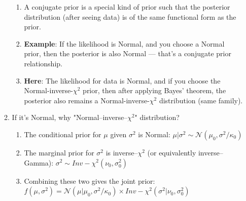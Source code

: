\begin{enumerate}
\begin{enumerate}
\begin{enumerate}
            \item A conjugate prior is a special kind of prior such that the posterior distribution (after seeing data) is of the same functional form as the prior.
            \hfill \cite{common/online/chatgpt}

            \item \textbf{Example}: If the likelihood is Normal, and you choose a Normal prior, then the posterior is also Normal — that’s a conjugate prior relationship.
            \hfill \cite{common/online/chatgpt}

            \item \textbf{Here}: The likelihood for data is Normal, and if you choose the Normal-inverse-$\chi^2$ prior, then after applying Bayes’ theorem, the posterior also remains a Normal-inverse-$\chi^2$ distribution (same family).
            \hfill \cite{common/online/chatgpt}
        \end{enumerate}

        \item If it’s Normal, why "Normal–inverse–$\chi^2$" distribution?
        \hfill \cite{common/online/chatgpt}
        \begin{enumerate}
            \item The conditional prior for $\mu$ given $\sigma^2$ is Normal: $\mu|\sigma^2 \sim \mathcal{N}(\mu_0,\sigma^2/\kappa_0)$
            \hfill \cite{common/online/chatgpt}

            \item The marginal prior for $\sigma^2$ is inverse–$\chi^2$ (or equivalently inverse–Gamma): $\sigma^2 \sim Inv-\chi^2(\nu_0,\sigma_0^2)$
            \hfill \cite{common/online/chatgpt}

            \item Combining these two gives the joint prior: $f(\mu,\sigma^2)=\mathcal{N}(\mu|\mu_0,\sigma^2/\kappa_0)\times Inv-\chi^2(\sigma^2|\nu_0,\sigma_0^2)$
            \hfill \cite{common/online/chatgpt}
        \end{enumerate}


\end{enumerate}
\end{enumerate}

